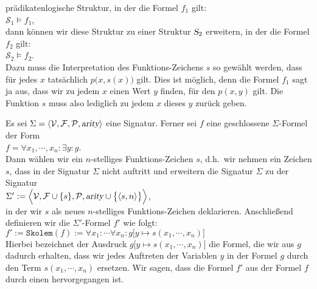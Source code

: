 prädikatenlogische Struktur, in der die Formel $f_1$ gilt:
\\[0.2cm]
\hspace*{1.3cm}
$\mathcal{S}_1 \models f_1$,
\\[0.2cm]
dann können wir diese Struktur zu einer Struktur $\textsl{S}_2$ erweitern, in der die
Formel $f_2$ gilt:
\\[0.2cm]
\hspace*{1.3cm}
$\mathcal{S}_2 \models f_2$.
\\[0.2cm]
Dazu muss die Interpretation des Funktions-Zeichens $s$ so gewählt werden, dass
für jedes $x$ tatsächlich $p\bigl(x,s(x)\bigr)$ gilt.  Dies ist möglich, denn die Formel $f_1$ sagt ja aus, 
dass wir zu jedem $x$ einen Wert $y$ finden, für den $p(x,y)$ gilt.   Die Funktion $s$ muss also lediglich zu 
jedem $x$ dieses $y$ zurück geben. 



\begin{Definition} \hspace*{\fill} \linebreak
  Es sei $\Sigma = \langle \mathcal{V}, \mathcal{F}, \mathcal{P}, \textsl{arity} \rangle$
  eine Signatur.  Ferner sei $f$ eine geschlossene $\Sigma$-Formel der Form \\[0.2cm]
  \hspace*{1.3cm} 
  $f = \forall x_1, \cdots, x_n \colon \exists y \colon g$. \\[0.2cm]
  Dann wählen wir ein \underline{} $n$-stelliges Funktions-Zeichen $s$, d.h.~wir nehmen ein Zeichen $s$, dass in
  der Signatur $\Sigma$ nicht auftritt und erweitern die Signatur $\Sigma$ zu der Signatur \\[0.2cm]
  \hspace*{1.3cm} 
  $\Sigma' := \Bigl\langle \mathcal{V}, \mathcal{F} \cup \{s\}, \mathcal{P}, \textsl{arity} \cup \bigl\{\pair(s,n)\bigr\} \Bigr\rangle$, \\[0.2cm]
  in der wir $s$ als neues $n$-stelliges Funktions-Zeichen deklarieren.  Anschließend definieren wir die $\Sigma'$-Formel
  $f'$ wie folgt: \\[0.2cm]
  \hspace*{1.3cm} 
  $f' := \mathtt{Skolem}(f) := 
  \forall x_1 \colon \cdots \forall x_n \colon g\bigl[y \mapsto s(x_1,\cdots,x_n)\bigr]$
  \\[0.2cm]
  Hierbei bezeichnet der Ausdruck $g\bigl[y \mapsto s(x_1,\cdots,x_n)\bigr]$ die Formel, die wir aus $g$
  dadurch erhalten, dass wir jedes Auftreten der Variablen $y$ in der Formel $g$ durch den Term
  $s(x_1,\cdots,x_n)$ ersetzen.  Wir sagen, dass die Formel $f'$ aus der Formel $f$
  durch einen  hervorgegangen ist. 
  \eox
\end{Definition}
\vspace{-0.5cm}

